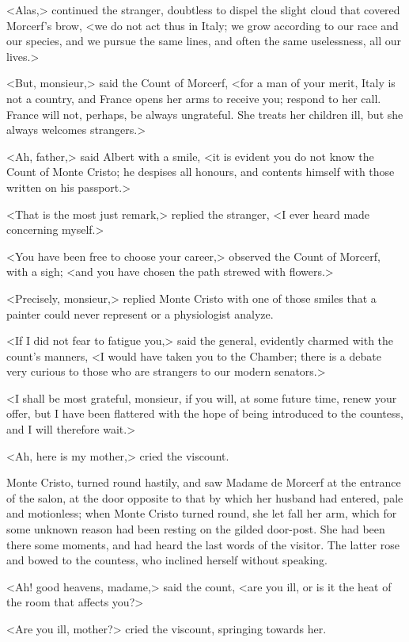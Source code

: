  <Alas,> continued the stranger, doubtless to dispel the slight cloud that covered Morcerf's brow, <we do not act thus in Italy; we grow according to our race and our species, and we pursue the same lines, and often the same uselessness, all our lives.> 

 <But, monsieur,> said the Count of Morcerf, <for a man of your merit, Italy is not a country, and France opens her arms to receive you; respond to her call. France will not, perhaps, be always ungrateful. She treats her children ill, but she always welcomes strangers.> 

 <Ah, father,> said Albert with a smile, <it is evident you do not know the Count of Monte Cristo; he despises all honours, and contents himself with those written on his passport.> 

 <That is the most just remark,> replied the stranger, <I ever heard made concerning myself.> 

 <You have been free to choose your career,> observed the Count of Morcerf, with a sigh; <and you have chosen the path strewed with flowers.> 

 <Precisely, monsieur,> replied Monte Cristo with one of those smiles that a painter could never represent or a physiologist analyze. 

 <If I did not fear to fatigue you,> said the general, evidently charmed with the count's manners, <I would have taken you to the Chamber; there is a debate very curious to those who are strangers to our modern senators.> 

 <I shall be most grateful, monsieur, if you will, at some future time, renew your offer, but I have been flattered with the hope of being introduced to the countess, and I will therefore wait.> 

 <Ah, here is my mother,> cried the viscount. 

 Monte Cristo, turned round hastily, and saw Madame de Morcerf at the entrance of the salon, at the door opposite to that by which her husband had entered, pale and motionless; when Monte Cristo turned round, she let fall her arm, which for some unknown reason had been resting on the gilded door-post. She had been there some moments, and had heard the last words of the visitor. The latter rose and bowed to the countess, who inclined herself without speaking. 

 <Ah! good heavens, madame,> said the count, <are you ill, or is it the heat of the room that affects you?> 

 <Are you ill, mother?> cried the viscount, springing towards her. 

